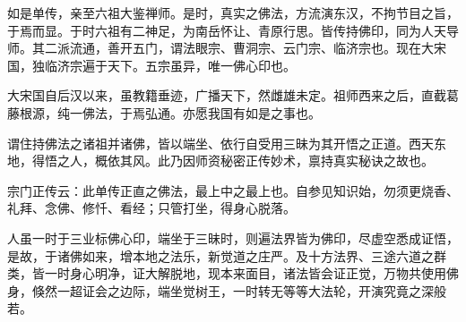 如是单传，亲至六祖大鉴禅师。是时，真实之佛法，方流演东汉，不拘节目之旨，于焉而显。于时六祖有二神足，为南岳怀让、青原行思。皆传持佛印，同为人天导师。其二派流通，善开五门，谓法眼宗、曹洞宗、云门宗、临济宗也。现在大宋国，独临济宗遍于天下。五宗虽异，唯一佛心印也。

大宋国自后汉以来，虽教籍垂迹，广播天下，然雌雄未定。祖师西来之后，直截葛藤根源，纯一佛法，于焉弘通。亦愿我国有如是之事也。

谓住持佛法之诸祖并诸佛，皆以端坐、依行自受用三昧为其开悟之正道。西天东地，得悟之人，概依其风。此乃因师资秘密正传妙术，禀持真实秘诀之故也。

宗门正传云：此单传正直之佛法，最上中之最上也。自参见知识始，勿须更烧香、礼拜、念佛、修忏、看经；只管打坐，得身心脱落。

人虽一时于三业标佛心印，端坐于三昧时，则遍法界皆为佛印，尽虚空悉成证悟，是故，于诸佛如来，增本地之法乐，新觉道之庄严。及十方法界、三途六道之群类，皆一时身心明净，证大解脱地，现本来面目，诸法皆会证正觉，万物共使用佛身，倏然一超证会之边际，端坐觉树王，一时转无等等大法轮，开演究竟之深般若。
